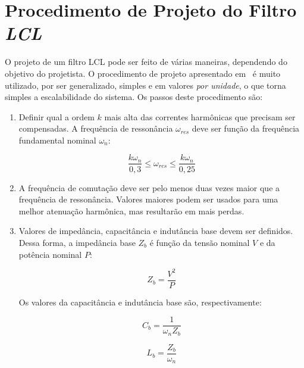 \chapter{Procedimento de Projeto do Filtro \textit{LCL}}

	O projeto de um filtro LCL pode ser feito de várias maneiras, dependendo
    do objetivo do projetista. O procedimento de projeto apresentado em~\cite{ref:TANG}
    é muito utilizado, por ser generalizado, simples e em valores \textit{por unidade},
    o que torna simples a escalabilidade do sistema. Os passos deste procedimento são:

    \begin{enumerate}

        \item Definir qual a ordem $k$ mais alta das correntes harmônicas que precisam ser
        compensadas. A frequência de ressonância $\omega_{res}$ deve ser função da frequência
        fundamental nominal $\omega_n$:

        \begin{equation}
            \frac{k \omega_n}{0,3} \leq \omega_{res} \leq \frac{k \omega_n}{0,25}
        \label{eq:wres}
        \end{equation}

        \item A frequência de comutação deve ser pelo menos duas vezes maior que a frequência
        de ressonância. Valores maiores podem ser usados para uma melhor atenuação harmônica,
        mas resultarão em mais perdas.

        \item Valores de impedância, capacitância e indutância base devem ser definidos. Dessa
        forma, a impedância base $Z_b$ é função da tensão nominal $V$ e da potência nominal $P$:

        \begin{equation}
            Z_b = \frac{V^2}{P}
        \end{equation}

        Os valores da capacitância e indutância base são, respectivamente:

        \begin{equation}
            C_b = \frac{1}{\omega_n Z_b}
        \end{equation}

        \begin{equation}
            L_b = \frac{Z_b}{\omega_n}
        \end{equation}


\end{enumerate}
